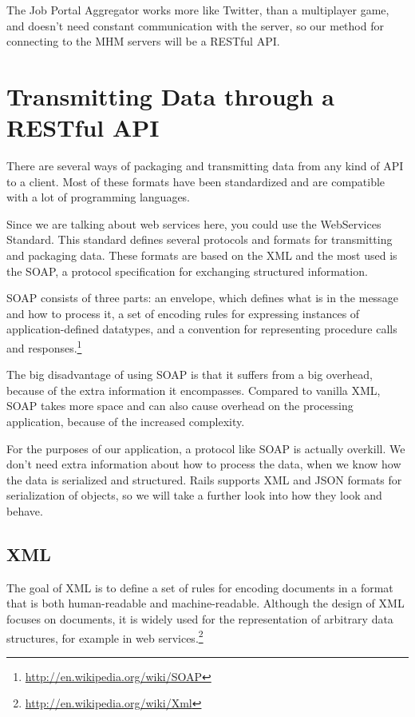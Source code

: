 The Job Portal Aggregator works more like Twitter, than a multiplayer game, and doesn't need constant communication with the server, so our method for connecting to the MHM servers will be a RESTful \ac{API}.

\section{Transmitting Data through a RESTful API}
There are several ways of packaging and transmitting data from any kind of \ac{API} to a client. Most of these formats have been standardized and are compatible with a lot of programming languages.

Since we are talking about web services here, you could use the WebServices Standard. This standard defines several protocols and formats for transmitting and packaging data. These formats are based on the \ac{XML} and the most used is the \ac{SOAP}, a protocol specification for exchanging structured information. 

\ac{SOAP} consists of three parts: an envelope, which defines what is in the message and how to process it, a set of encoding rules for expressing instances of application-defined datatypes, and a convention for representing procedure calls and responses.\footnote{\url{http://en.wikipedia.org/wiki/SOAP}}

The big disadvantage of using \ac{SOAP} is that it suffers from a big overhead, because of the extra information it encompasses. Compared to vanilla \ac{XML}, \ac{SOAP} takes more space and can also cause overhead on the processing application, because of the increased complexity.

For the purposes of our application, a protocol like \ac{SOAP} is actually overkill. We don't need extra information about how to process the data, when we know how the data is serialized and structured. Rails supports \ac{XML} and \ac{JSON} formats for serialization of objects, so we will take a further look into how they look and behave.

\subsection{XML}
The goal of \ac{XML} is to define a set of rules for encoding documents in a format that is both human-readable and machine-readable. Although the design of XML focuses on documents, it is widely used for the representation of arbitrary data structures, for example in web services.\footnote{\url{http://en.wikipedia.org/wiki/Xml}}

